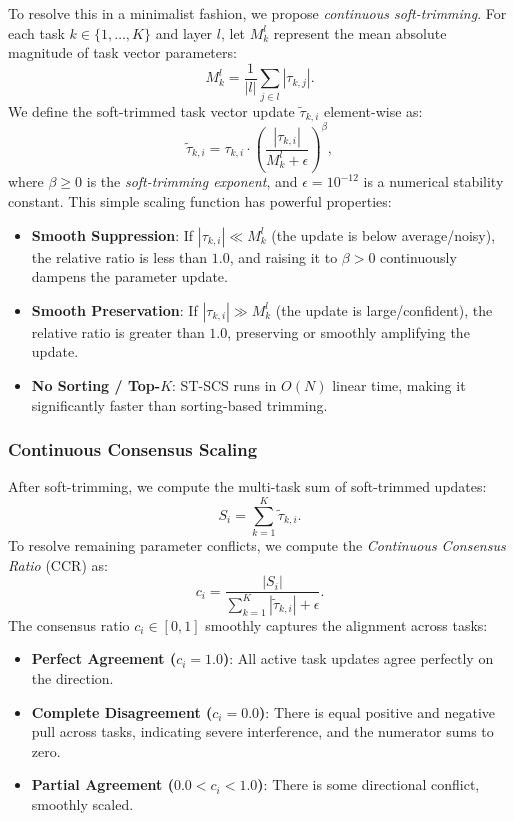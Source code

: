 \documentclass{article}
\theoremstyle{plain}
\theoremstyle{definition}
\theoremstyle{remark}
\begin{document}
To resolve this in a minimalist fashion, we propose \emph{continuous soft-trimming}. For each task $k \in \{1, \dots, K\}$ and layer $l$, let $M_k^l$ represent the mean absolute magnitude of task vector parameters:
\begin{equation}
    M_k^l = \frac{1}{|l|} \sum_{j \in l} |\tau_{k, j}|.
\end{equation}
We define the soft-trimmed task vector update $\tilde{\tau}_{k, i}$ element-wise as:
\begin{equation}
    \tilde{\tau}_{k, i} = \tau_{k, i} \cdot \left( \frac{|\tau_{k, i}|}{M_k^l + \epsilon} \right)^\beta,
\end{equation}
where $\beta \ge 0$ is the \emph{soft-trimming exponent}, and $\epsilon = 10^{-12}$ is a numerical stability constant.
This simple scaling function has powerful properties:
\begin{itemize}
    \item \textbf{Smooth Suppression}: If $|\tau_{k, i}| \ll M_k^l$ (the update is below average/noisy), the relative ratio is less than $1.0$, and raising it to $\beta > 0$ continuously dampens the parameter update.
    \item \textbf{Smooth Preservation}: If $|\tau_{k, i}| \gg M_k^l$ (the update is large/confident), the relative ratio is greater than $1.0$, preserving or smoothly amplifying the update.
    \item \textbf{No Sorting / Top-$K$}: ST-SCS runs in $O(N)$ linear time, making it significantly faster than sorting-based trimming.
\end{itemize}

\subsubsection{Continuous Consensus Scaling}
After soft-trimming, we compute the multi-task sum of soft-trimmed updates:
\begin{equation}
    S_i = \sum_{k=1}^K \tilde{\tau}_{k, i}.
\end{equation}
To resolve remaining parameter conflicts, we compute the \emph{Continuous Consensus Ratio} (CCR) as:
\begin{equation}
    c_i = \frac{|S_i|}{\sum_{k=1}^K |\tilde{\tau}_{k, i}| + \epsilon}.
\end{equation}
The consensus ratio $c_i \in [0, 1]$ smoothly captures the alignment across tasks:
\begin{itemize}
    \item \textbf{Perfect Agreement ($c_i = 1.0$)}: All active task updates agree perfectly on the direction.
    \item \textbf{Complete Disagreement ($c_i = 0.0$)}: There is equal positive and negative pull across tasks, indicating severe interference, and the numerator sums to zero.
    \item \textbf{Partial Agreement ($0.0 < c_i < 1.0$)}: There is some directional conflict, smoothly scaled.
\end{itemize}
\end{document}
